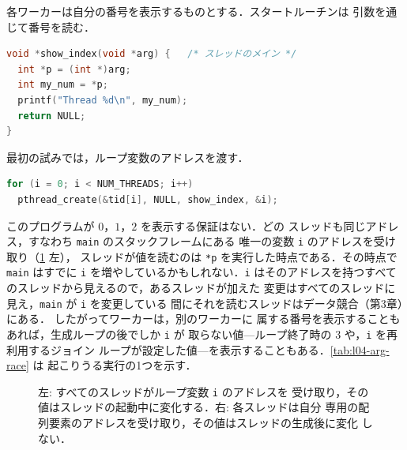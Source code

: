 \documentclass[../main.tex]{subfiles}
\begin{document}
各ワーカーは自分の番号を表示するものとする．スタートルーチンは
引数を通じて番号を読む．
\begin{lstlisting}[language=C, numbers=none]
void *show_index(void *arg) {   /* スレッドのメイン */
  int *p = (int *)arg;
  int my_num = *p;
  printf("Thread %d\n", my_num);
  return NULL;
}
\end{lstlisting}
最初の試みでは，ループ変数のアドレスを渡す．
\begin{lstlisting}[language=C, numbers=none]
for (i = 0; i < NUM_THREADS; i++)
  pthread_create(&tid[i], NULL, show_index, &i);
\end{lstlisting}
このプログラムが $0$，$1$，$2$ を表示する保証はない．どの
スレッドも同じアドレス，すなわち \texttt{main} のスタックフレームにある
唯一の変数 \texttt{i} のアドレスを受け取り（\cref{fig:l04-args} 左），
スレッドが値を読むのは \texttt{*p} を実行した時点である．その時点で
\texttt{main} はすでに \texttt{i} を増やしているかもしれない．\texttt{i}
はそのアドレスを持つすべてのスレッドから見えるので，あるスレッドが加えた
変更はすべてのスレッドに見え，\texttt{main} が \texttt{i} を変更している
間にそれを読むスレッドはデータ競合（第3章）にある．%
したがってワーカーは，別のワーカーに
属する番号を表示することもあれば，生成ループの後でしか \texttt{i} が
取らない値---ループ終了時の $3$ や，\texttt{i} を再利用するジョイン
ループが設定した値---を表示することもある．\cref{tab:l04-arg-race} は
起こりうる実行の1つを示す．

\begin{figure}[htbp]
  \centering
  
  \caption{左: すべてのスレッドがループ変数 \texttt{i} のアドレスを
    受け取り，その値はスレッドの起動中に変化する．右: 各スレッドは自分
    専用の配列要素のアドレスを受け取り，その値はスレッドの生成後に変化
    しない．}
  \label{fig:l04-args}
\end{figure}
\end{document}
